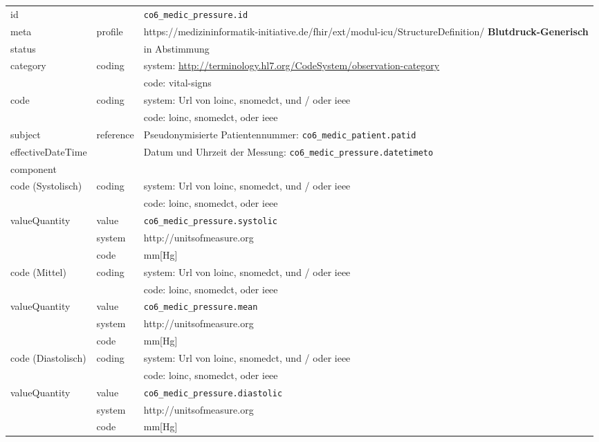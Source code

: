 \begin{longtable}{|l|l|p{7.5cm}|}
        \hline
        \rowcolor{lightgray} \multicolumn{3}{|l|}{Data Mapping (inhaltlich)} \\ \hline
        id &  & \texttt{co6\_medic\_pressure.id} \\ \hline
	meta & profile & https://medizininformatik-initiative.de/fhir/ext/modul-icu/StructureDefinition/\textbf{
Blutdruck-Generisch} \\ \hline 
	status &  & in Abstimmung  \\ \hline 
	category & coding & system: \url{http://terminology.hl7.org/CodeSystem/observation-category} \\ 
\cline{3-3}
        & & code: vital-signs \\ \hline
        code & coding & system: Url von \ac{loinc}, \ac{snomedct}, und / oder \ac{ieee} \\
        \cline{3-3}
         &  & code: \ac{loinc}, \ac{snomedct}, oder \ac{ieee} \\ \hline
        subject & reference & Pseudonymisierte Patientennummer: \texttt{co6\_medic\_patient.patid} \\ \hline
        effectiveDateTime & & Datum und Uhrzeit der Messung:  \texttt{co6\_medic\_pressure.datetimeto} \\ \hline
	\multicolumn{3}{|l|}{component} \\ \hline
	code (Systolisch)  & coding & system: Url von \ac{loinc}, \ac{snomedct}, und / oder \ac{ieee} \\ 
	\cline{3-3} 
	&  & code: \ac{loinc}, \ac{snomedct}, oder \ac{ieee} \\ \hline	
	valueQuantity & value & \texttt{co6\_medic\_pressure.systolic} \\
	\cline{2-3}
	& system & http://unitsofmeasure.org \\ 
	\cline{2-3}
	& code & mm[Hg] \\ \hline
	code (Mittel)  & coding & system: Url von \ac{loinc}, \ac{snomedct}, und / oder \ac{ieee} \\ 
	\cline{3-3} 
	&  & code: \ac{loinc}, \ac{snomedct}, oder \ac{ieee} \\ \hline	
	valueQuantity & value & \texttt{co6\_medic\_pressure.mean} \\
	\cline{2-3}
	& system & http://unitsofmeasure.org \\ 
	\cline{2-3}
	& code &  mm[Hg] \\ \hline
	code (Diastolisch)  & coding & system: Url von \ac{loinc}, \ac{snomedct}, und / oder \ac{ieee} \\ 
	\cline{3-3} 
	&  & code: \ac{loinc}, \ac{snomedct}, oder \ac{ieee} \\ \hline	
	valueQuantity & value & \texttt{co6\_medic\_pressure.diastolic} \\
	\cline{2-3}
	& system & http://unitsofmeasure.org \\ 
	\cline{2-3}
	& code & mm[Hg] \\ \hline
\end{longtable}

